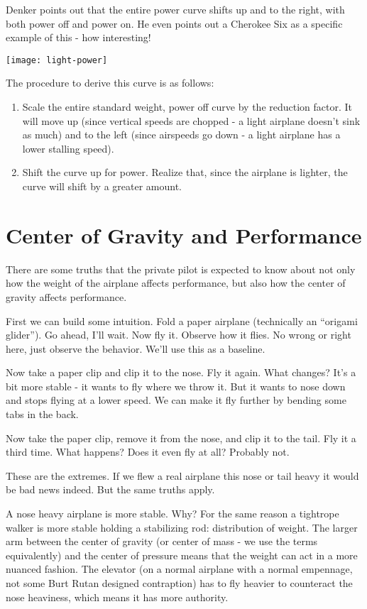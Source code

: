 Denker points out that the entire power curve shifts up and to the right, with both power off and power on. He even points out a Cherokee Six as a specific example of this - how interesting!

\texttt{[image: light-power]}

The procedure to derive this curve is as follows:

\begin{enumerate}
\item Scale the entire standard weight, power off curve by the reduction factor. It will move up (since vertical speeds are chopped - a light airplane doesn't sink as much) and to the left (since airspeeds go down - a light airplane has a lower stalling speed).
\item Shift the curve up for power. Realize that, since the airplane is lighter, the curve will shift by a greater amount.
\end{enumerate}

\section{Center of Gravity and Performance}

There are some truths that the private pilot is expected to know about not only how the weight of the airplane affects performance, but also how the center of gravity affects performance.

First we can build some intuition. Fold a paper airplane (technically an ``origami glider''). Go ahead, I'll wait. Now fly it. Observe how it flies. No wrong or right here, just observe the behavior. We'll use this as a baseline.

Now take a paper clip and clip it to the nose. Fly it again. What changes? It's a bit more stable - it wants to fly where we throw it. But it wants to nose down and stops flying at a lower speed. We can make it fly further by bending some tabs in the back.

Now take the paper clip, remove it from the nose, and clip it to the tail. Fly it a third time. What happens? Does it even fly at all? Probably not.

These are the extremes. If we flew a real airplane this nose or tail heavy it would be bad news indeed. But the same truths apply.

A nose heavy airplane is more stable. Why? For the same reason a tightrope walker is more stable holding a stabilizing rod: distribution of weight. The larger arm between the center of gravity (or center of mass - we use the terms equivalently) and the center of pressure means that the weight can act in a more nuanced fashion. The elevator (on a normal airplane with a normal empennage, not some Burt Rutan designed contraption) has to fly heavier to counteract the nose heaviness, which means it has more authority.

